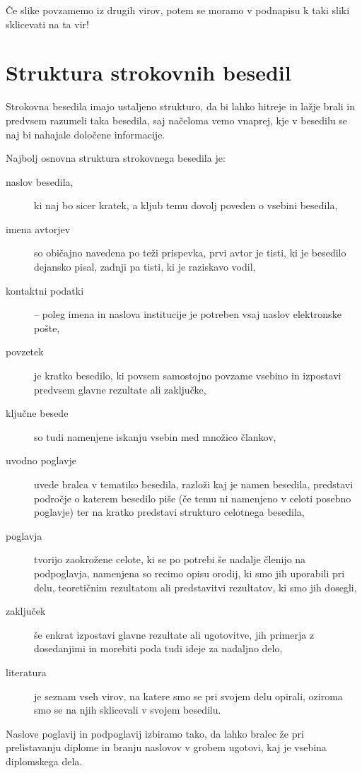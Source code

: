 \documentclass[a4paper,12pt,openright]{book}
\begin{document}
Če slike povzamemo iz drugih virov, potem se moramo v podnapisu k taki sliki sklicevati na ta vir!


\chapter{Struktura strokovnih besedil}
\label{stroka}

Strokovna besedila imajo ustaljeno strukturo, da bi lahko hitreje in lažje brali in predvsem razumeli taka besedila, saj načeloma vemo vnaprej, 
kje v besedilu se naj bi nahajale določene informacije.

Najbolj osnovna struktura strokovnega besedila je:
\begin{description}
\item[naslov besedila,] ki naj bo sicer kratek, a kljub temu dovolj poveden o vsebini besedila,
\item[imena avtorjev] so običajno navedena po teži prispevka, prvi avtor je tisti, ki je besedilo dejansko pisal, zadnji pa tisti, ki je raziskavo vodil,
\item[kontaktni podatki] -- poleg imena in naslova institucije je potreben vsaj naslov elektronske pošte,
\item[povzetek] je kratko besedilo, ki povsem samostojno povzame vsebino in izpostavi predvsem  glavne rezultate ali zaključke,
\item[ključne besede] so tudi namenjene iskanju vsebin med množico člankov,
\item[uvodno poglavje] uvede bralca v tematiko besedila, razloži kaj je namen besedila, predstavi področje o katerem besedilo piše 
(če temu ni namenjeno v celoti posebno poglavje) ter na kratko predstavi strukturo celotnega besedila,
\item[poglavja] tvorijo zaokrožene celote, ki se po potrebi še nadalje členijo na podpoglavja, namenjena so recimo opisu orodij, 
ki smo jih uporabili pri delu, teoretičnim rezultatom ali predstavitvi rezultatov, ki smo jih dosegli,
\item[zaključek] še enkrat izpostavi glavne rezultate ali ugotovitve, jih primerja z dosedanjimi in morebiti poda tudi ideje za nadaljno delo,
\item[literatura] je seznam vseh virov, na katere smo se pri svojem delu opirali, oziroma smo se na njih sklicevali v svojem besedilu.
\end{description}

Naslove poglavij in podpoglavij izbiramo tako, da lahko bralec že pri prelistavanju diplome in branju naslovov
v grobem ugotovi, kaj je vsebina diplomskega dela.
\end{document}
